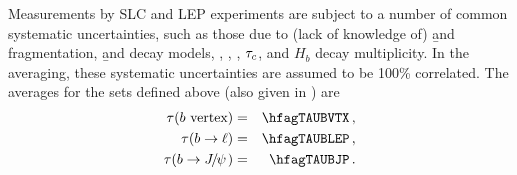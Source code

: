 Measurements by SLC and LEP experiments are subject to a number of
common systematic uncertainties, such as those due to (lack of knowledge
of) \b and  fragmentation, \b and  decay models,
, , , $\tau_{c}$,
and $H_b$ decay multiplicity.  In the averaging, these systematic
uncertainties are assumed to be 100\% correlated.  The averages for the
sets defined above (also given in ) are
\begin{eqnarray}
\tau(\b~\mbox{vertex}) &=& \hfagTAUBVTX \,, \labe{TAUBVTX} \\
\tau(\b\to\ell) &=& \hfagTAUBLEP  \,, \\
\tau(\b\to\particle{\jpsi}) &=& \hfagTAUBJP\,.
\end{eqnarray}



